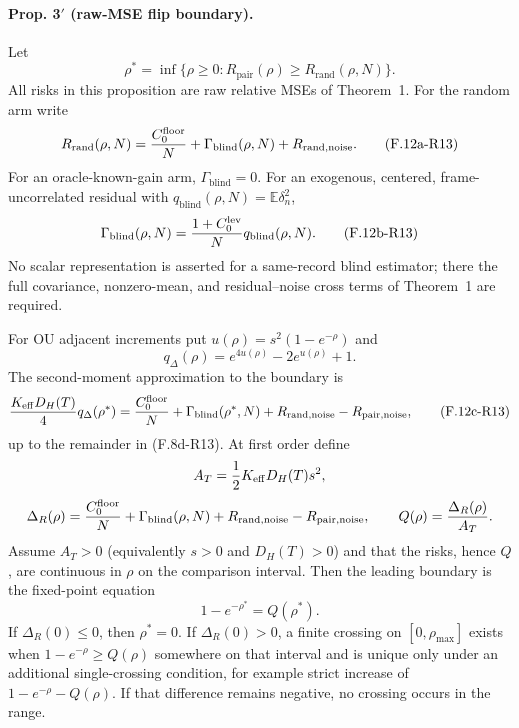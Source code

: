 \paragraph{Prop. 3$'$ (raw-MSE flip boundary).}
Let
\[
 \rho^*=\inf\{\rho\ge0:
 R_{\mathrm{pair}}(\rho)\ge R_{\mathrm{rand}}(\rho,N)\}.
\]
All risks in this proposition are raw relative MSEs of Theorem~1.  For
the random arm write
\begin{equation}
 R_{\mathrm{rand}}(\rho,N)
 ={C_0^{\mathrm{floor}}\over N}
 +\Gamma_{\mathrm{blind}}(\rho,N)
 +R_{\mathrm{rand,noise}}. \tag{F.12a-R13}
\end{equation}
For an oracle-known-gain arm, $\Gamma_{\mathrm{blind}}=0$.  For an
exogenous, centered, frame-uncorrelated residual with
$q_{\mathrm{blind}}(\rho,N)=\mathbb E\delta_n^2$,
\begin{equation}
 \Gamma_{\mathrm{blind}}(\rho,N)
 ={1+C_0^{\mathrm{lev}}\over N}
 q_{\mathrm{blind}}(\rho,N). \tag{F.12b-R13}
\end{equation}
No scalar representation is asserted for a same-record blind estimator;
there the full covariance, nonzero-mean, and residual--noise cross terms
of Theorem~1 are required.

For OU adjacent increments put
$u(\rho)=s^2(1-e^{-\rho})$ and
\[
 q_\Delta(\rho)=e^{4u(\rho)}-2e^{u(\rho)}+1.
\]
The second-moment approximation to the boundary is
\begin{equation}
 {K_{\mathrm{eff}}D_H(T)\over4}q_\Delta(\rho^*)
 ={C_0^{\mathrm{floor}}\over N}
 +\Gamma_{\mathrm{blind}}(\rho^*,N)
 +R_{\mathrm{rand,noise}}-R_{\mathrm{pair,noise}},
 \tag{F.12c-R13}
\end{equation}
up to the remainder in (F.8d-R13).  At first order define
\[
 A_T={1\over2}K_{\mathrm{eff}}D_H(T)s^2,
\]
\[
 \Delta_R(\rho)={C_0^{\mathrm{floor}}\over N}
 +\Gamma_{\mathrm{blind}}(\rho,N)
 +R_{\mathrm{rand,noise}}-R_{\mathrm{pair,noise}},
 \qquad Q(\rho)={\Delta_R(\rho)\over A_T}.
\]
Assume $A_T>0$ (equivalently $s>0$ and $D_H(T)>0$) and that the risks,
hence $Q$, are continuous in $\rho$ on the comparison interval.  Then
the leading boundary is the fixed-point equation
\begin{equation}
 1-e^{-\rho^*}=Q(\rho^*). \tag{F.12-R13}
\end{equation}
If $\Delta_R(0)\le0$, then $\rho^*=0$.  If
$\Delta_R(0)>0$, a finite crossing on $[0,\rho_{\max}]$ exists when
$1-e^{-\rho}\ge Q(\rho)$ somewhere on that interval and is unique
only under an additional single-crossing condition, for example strict
increase of $1-e^{-\rho}-Q(\rho)$.  If that difference remains
negative, no crossing occurs in the range.

